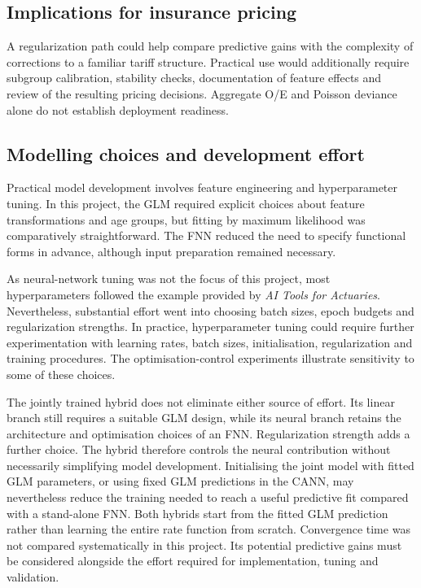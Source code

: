 \documentclass[a4paper]{article}
\begin{document}
\subsection{Implications for insurance pricing}
A regularization path could help compare predictive gains with the
complexity of corrections to a familiar tariff structure.
Practical use would additionally require subgroup calibration, stability
checks, documentation of feature effects and review of the resulting
pricing decisions.
Aggregate O/E and Poisson deviance alone do not establish deployment
readiness.

\subsection{Modelling choices and development effort}
Practical model development involves feature engineering and hyperparameter tuning.
In this project, the GLM required explicit choices about feature transformations and age groups,
but fitting by maximum likelihood was comparatively straightforward.
The FNN reduced the need to specify functional forms in advance, although input preparation remained necessary.

As neural-network tuning was not the focus of this project,
most hyperparameters followed the example provided by
\emph{AI Tools for Actuaries}.
Nevertheless, substantial effort went into choosing batch sizes, epoch
budgets and regularization strengths.
In practice, hyperparameter tuning could require further experimentation
with learning rates, batch sizes, initialisation, regularization and
training procedures.
The optimisation-control experiments illustrate sensitivity to some of these choices.

The jointly trained hybrid does not eliminate either source of effort.
Its linear branch still requires a suitable GLM design, while its neural
branch retains the architecture and optimisation choices of an FNN.
Regularization strength adds a further choice.
The hybrid therefore controls the neural contribution without necessarily
simplifying model development.
Initialising the joint model with fitted GLM parameters, or using fixed
GLM predictions in the CANN, may nevertheless reduce the training needed
to reach a useful predictive fit compared with a stand-alone FNN.
Both hybrids start from the fitted GLM prediction rather than learning
the entire rate function from scratch.
Convergence time was not compared systematically in this project.
Its potential predictive gains must be considered alongside the effort
required for implementation, tuning and validation.
\end{document}
